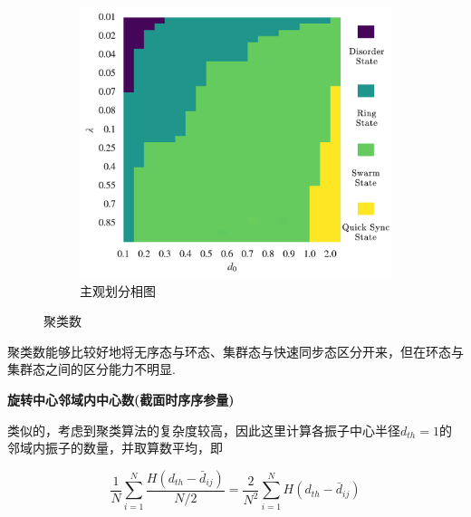 \documentclass{article}
\begin{document}
\begin{figure}[H]
\begin{subfigure}[b]{0.49\textwidth}
		\includegraphics[width=\textwidth]{./figs/subjectiveOp2.png}
		\vspace{-1cm}
		\caption{主观划分相图}
	\end{subfigure}

	\vspace{-0.5cm}
	\caption{聚类数}
	\label{fig:fig234c.7}
\end{figure}

聚类数能够比较好地将无序态与环态、集群态与快速同步态区分开来，但在环态与集群态之间的区分能力不明显.

\noindent\textbf{旋转中心邻域内中心数(截面时序序参量)}

类似的，考虑到聚类算法的复杂度较高，因此这里计算各振子中心半径$d_{th}=1$的邻域内振子的数量，并取算数平均，即

$$
\frac{1}{N}\sum_{i=1}^N{\frac{H\left( d_{th}-\bar{d}_{ij} \right)}{N/2}}=\frac{2}{N^2}\sum_{i=1}^N{H\left( d_{th}-\bar{d}_{ij} \right)}
$$
\end{document}
